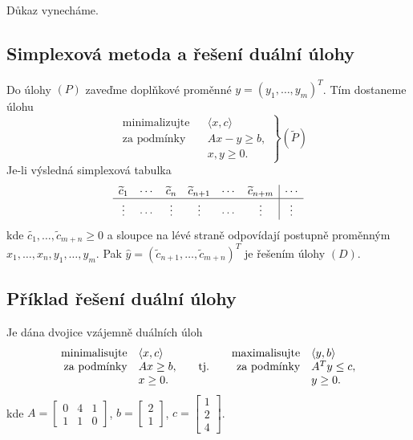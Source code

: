 Důkaz vynecháme.

\subsection{Simplexová metoda a řešení duální úlohy}\label{simplDual}
Do úlohy $(P)$ zaveďme doplňkové proměnné $y = (y_1, \dots, y_m)^T$. Tím dostaneme úlohu
\[
\left.\begin{aligned}
    &\text{minimalizujte}&& \langle x, c \rangle \\
    &\text{za podmínky}  && Ax -y \geq b, \\
    &                    && x,y \geq 0.
\end{aligned}
\right\} (\widetilde{P})
\]
Je-li výsledná simplexová tabulka
\[
    \begin{array}{cccc cc|c}
        \widetilde{c}_1 & \cdots & \widetilde{c}_n & \widetilde{c}_{n+1} & \cdots & \widetilde{c}_{n+m} & \cdots \\ \hline
        \vdots      & \cdots & \vdots      & \vdots          & \cdots & \vdots          & \vdots \\
    \end{array}
\]
kde $\widetilde{c_1}, \dots, \widetilde{c}_{m+n} \geq 0$ a sloupce na lévé straně odpovídají postupně proměnným 
$x_1, \dots, x_n, y_1, \dots, y_m$. Pak $\hat y = \left(\widetilde{c}_{n+1},\dots, \widetilde{c}_{m+n}\right)^T$ je řešením 
úlohy $(D)$.

\subsection{Příklad řešení duální úlohy}
Je dána dvojice vzájemně duálních úloh
\[
    \begin{array}{r@{\quad}l@{\qquad}c@{\qquad}r@{\quad}l}
        \text{minimalisujte}& \langle x,c \rangle&           & \text{maximalisujte}& \langle y,b \rangle \\
        \text{za podmínky}  & Ax \geq b,         & \text{tj.}&\text{za podmínky}   & A^Ty \leq c, \\
                            & x \geq 0.          &           &                     & y \geq 0.
    \end{array}
\]
kde $A = 
\begin{bmatrix}
    0 & 4 & 1 \\
    1 & 1 & 0
\end{bmatrix}$, $b = 
\begin{bmatrix}
    2 \\ 1
\end{bmatrix}$, $c = 
\begin{bmatrix}
    1 \\ 2 \\ 4
\end{bmatrix}$.

